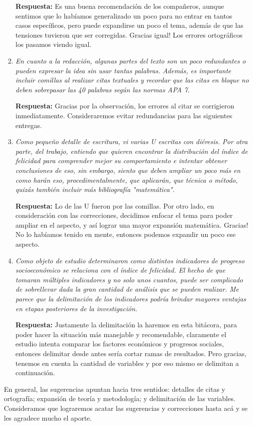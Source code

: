 \begin{enumerate}
    \textbf{Respuesta:} Es una buena recomendación de los compañeros, aunque sentimos que lo habíamos generalizado un poco para no entrar en tantos casos específicos, pero puede expandirse un poco el tema, además de que las tensiones tuvieron que ser corregidas. Gracias igual! Los errores ortográficos los pasamos viendo igual. 

    \item \textit{En cuanto a la redacción, algunas partes del texto son un poco redundantes o pueden expresar la idea sin usar tantas palabras. Además, es importante incluir comillas al realizar citas textuales y recordar que las citas en bloque no deben sobrepasar las 40 palabras según las normas APA 7.}

    \textbf{Respuesta:} Gracias por la observación, los errores al citar se corrigieron inmediatamente. Consideraremos evitar redundancias para las siguientes entregas.

    \item \textit{Como pequeño detalle de escritura, vi varias U escritas con diéresis. Por otra parte, del trabajo, entiendo que quieren encontrar la distribución del índice de felicidad para comprender mejor su comportamiento e intentar obtener conclusiones de eso, sin embargo, siento que deben ampliar un poco más en como harán eso, procedimentalmente, que aplicarán, que técnica o método, quizás también incluir más bibliografía "matemática".}

    \textbf{Respuesta:} Lo de las U fueron por las comillas. Por otro lado, en consideración con las correcciones, decidimos enfocar el tema para poder ampliar en el aspecto, y así lograr una mayor expansión matemática. Gracias! No lo habíamos tenido en mente, entonces podemos expandir un poco ese aspecto.
    
    \item \textit{Como objeto de estudio determinaron como distintos indicadores de progreso socioeconómico se relaciona con el índice de felicidad. El hecho de que tomaran múltiples indicadores y no solo unos cuantos, puede ser complicado de sobrellevar dada la gran cantidad de análisis que se pueden realizar. Me parece que la delimitación de los indicadores podría brindar mayores ventajas en etapas posteriores de la investigación.} 

    \textbf{Respuesta:} Justamente la delimitación la haremos en esta bitácora, para poder hacer la situación más manejable y recomendable, claramente el estudio intenta comparar los factores económicos y progresos sociales, entonces delimitar desde antes sería cortar ramas de resultados. Pero gracias, tenemos en cuenta la cantidad de variables y por eso mismo se delimitan a continuación. 
    
\end{enumerate}

En general, las sugerencias apuntan hacia tres sentidos: detalles de citas y ortografía; expansión de teoría y metodología; y delimitación de las variables. Consideramos que lograremos acatar las sugerencias y correcciones hasta acá y se les agradece mucho el aporte. 

